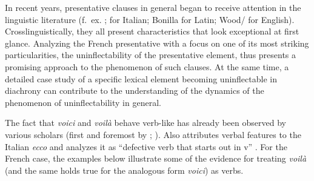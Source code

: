 \documentclass[output=paper]{langscibook}
\begin{document}
In recent years, presentative clauses in general began to receive attention in the linguistic literature (f.~ex. \citealt{Julia2018}; \citealt{Zanuttini2017} for Italian; Bonilla \citealt{Carvajal2020} for Latin; Wood/\citealt{Zanuttini2023} for English). Crosslinguistically, they all present characteristics that look exceptional at first glance. Analyzing the French presentative with a focus on one of its most striking particularities, the uninflectability of the presentative element, thus presents a promising approach to the phenomenon of such clauses. At the same time, a detailed case study of a specific lexical element becoming uninflectable in diachrony can contribute to the understanding of the dynamics of the phenomenon of uninflectability in general. 

The fact that \textit{voici} and \textit{voilà} behave verb-like has already been observed by various scholars (first and foremost by \citealt{Moignet1974}; \citealt{Morin1985}). Also \citet{Zanuttini2017} attributes verbal features to the Italian \textit{ecco} and analyzes it as “defective verb that starts out in v” . For the French case, the examples below illustrate some of the evidence for treating \textit{voilà} (and the same holds true for the analogous form \textit{voici}) as verbs.
\end{document}

